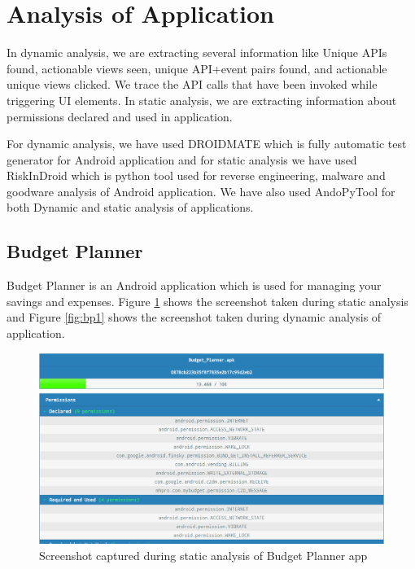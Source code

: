 \section{Analysis of Application}
In dynamic analysis, we are extracting several information like Unique APIs found, actionable views seen, unique API+event pairs found, and actionable unique views clicked. We trace the API calls that have been invoked while triggering UI elements. In static analysis, we are extracting information about permissions declared and used in application.

For dynamic analysis, we have used DROIDMATE which is fully automatic test generator for Android application and for static analysis we have used RiskInDroid which is python tool used for reverse engineering, malware and goodware analysis of Android application. We have also used AndoPyTool for both Dynamic and static analysis of applications.
\subsection{Budget Planner}
Budget Planner is an Android application which is used for managing your savings and expenses. Figure \ref{fig:bp} shows the screenshot taken during static analysis and Figure \ref{fig:bp1}  shows the screenshot taken during dynamic analysis of application.
\begin{figure}[!h]
  \centering
  \includegraphics [scale=0.5] {bp.png}
  \caption{Screenshot captured during static analysis of Budget Planner app}
  \label{fig:bp}
\end{figure}
